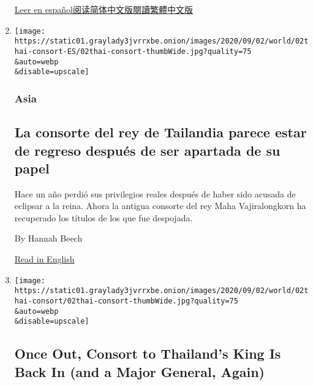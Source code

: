 \begin{enumerate}
  \href{https://www.nytimes3xbfgragh.onion/es/2020/09/08/espanol/mundo/rohinya-genocidio-birmania.html}{Leer
  en
  español}\href{https://cn.nytimes3xbfgragh.onion/world/20200909/myanmar-rohingya-genocide/}{阅读简体中文版}\href{https://cn.nytimes3xbfgragh.onion/world/20200909/myanmar-rohingya-genocide/zh-hant/}{閱讀繁體中文版}
\item
  \href{/es/2020/09/02/espanol/mundo/consorte-real-tailandia.html}{}

  \texttt{[image: https://static01.graylady3jvrrxbe.onion/images/2020/09/02/world/02thai-consort-ES/02thai-consort-thumbWide.jpg?quality=75\\\&auto=webp\\\&disable=upscale]}

  \hypertarget{asia}{%
  \subsubsection{Asia}\label{asia}}

  \hypertarget{la-consorte-del-rey-de-tailandia-parece-estar-de-regreso-despuuxe9s-de-ser-apartada-de-su-papel}{%
  \subsection{La consorte del rey de Tailandia parece estar de regreso
  después de ser apartada de su
  papel}\label{la-consorte-del-rey-de-tailandia-parece-estar-de-regreso-despuuxe9s-de-ser-apartada-de-su-papel}}

  Hace un año perdió sus privilegios reales después de haber sido
  acusada de eclipsar a la reina. Ahora la antigua consorte del rey Maha
  Vajiralongkorn ha recuperado los títulos de los que fue despojada.

  By Hannah Beech

  \href{https://www.nytimes3xbfgragh.onion/2020/09/02/world/asia/thailand-king-consort.html}{Read
  in English}
\item
  \href{/2020/09/02/world/asia/thailand-king-consort.html}{}

  \texttt{[image: https://static01.graylady3jvrrxbe.onion/images/2020/09/02/world/02thai-consort/02thai-consort-thumbWide.jpg?quality=75\\\&auto=webp\\\&disable=upscale]}

  \hypertarget{once-out-consort-to-thailands-king-is-back-in-and-a-major-general-again}{%
  \subsection{Once Out, Consort to Thailand's King Is Back In (and a
  Major General,
  Again)}\label{once-out-consort-to-thailands-king-is-back-in-and-a-major-general-again}}


\end{enumerate}
